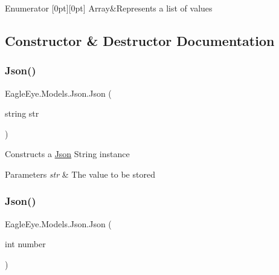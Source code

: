 \begin{DoxyEnumFields}{Enumerator}
[0pt][0pt]{}\mbox{\label{class_eagle_eye_1_1_models_1_1_json_afdf0e16163f8b9bab5b45d6d01e8133ca4410ec34d9e6c1a68100ca0ce033fb17}} 
Array&Represents a list of values \\
\hline

\end{DoxyEnumFields}


\subsection{Constructor \& Destructor Documentation}
\mbox{\label{class_eagle_eye_1_1_models_1_1_json_ad5ccac28bacaf78710b8d7fb73911426}} 
\subsubsection{\texorpdfstring{Json()}{Json()}\hspace{0.1cm}{\footnotesize\ttfamily [1/4]}}
{\footnotesize\ttfamily Eagle\+Eye.\+Models.\+Json.\+Json (\begin{DoxyParamCaption}\item[{string}]{str }\end{DoxyParamCaption})}



Constructs a \mbox{\hyperlink{class_eagle_eye_1_1_models_1_1_json}{Json}} String instance 


\begin{DoxyParams}{Parameters}
{\em str} & The value to be stored\\
\hline
\end{DoxyParams}
\mbox{\label{class_eagle_eye_1_1_models_1_1_json_a2b753342c141001d4d8ba07c2040728f}} 
\subsubsection{\texorpdfstring{Json()}{Json()}\hspace{0.1cm}{\footnotesize\ttfamily [2/4]}}
{\footnotesize\ttfamily Eagle\+Eye.\+Models.\+Json.\+Json (\begin{DoxyParamCaption}\item[{int}]{number }\end{DoxyParamCaption})}



